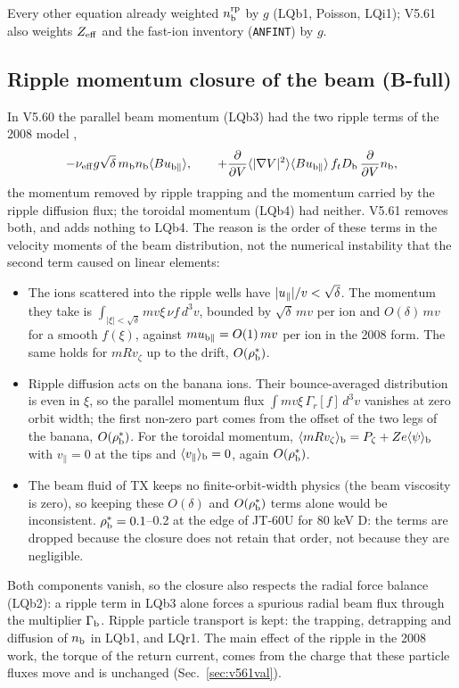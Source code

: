 \documentclass[11pt]{article}
\def\r#1{{\rm#1}}
\def\aves#1{\langle#1\rangle}
\def\para{\parallel}
\def\ddV{\frac{\partial}{\partial V}}
\def\mb{m_\r{b}}
\def\nb{n_\r{b}}
\def\upara#1{u_{\r{#1}\para}}
\def\nbrp{n_\r{b}^\r{rp}}
\def\Db{D_\r{b}}
\def\nueff{\nu_\r{eff}}
\begin{document}
Every other equation already weighted $\nbrp$ by $g$ (LQb1, Poisson, LQi1); V5.61
also weights $Z_\r{eff}$ and the fast-ion inventory (\texttt{ANFINT}) by $g$.

\subsection{Ripple momentum closure of the beam (B-full)}

In V5.60 the parallel beam momentum (LQb3) had the two ripple terms of the 2008
model \cite{NF2008},
\begin{equation}
  -\nueff g\sqrt\delta\,\mb\nb\aves{B\upara{b}} , \qquad
  +\ddV\aves{|\nabla V|^2}\aves{B\upara{b}}\,f_t\Db\,\ddV\nb ,
\end{equation}
the momentum removed by ripple trapping and the momentum carried by the ripple
diffusion flux; the toroidal momentum (LQb4) had neither.  V5.61 removes both,
and adds nothing to LQb4.  The reason is the order of these terms in the
velocity moments of the beam distribution, not the numerical instability that
the second term caused on linear elements:
\begin{itemize}
\item The ions scattered into the ripple wells have $|\upara{}|/v < \sqrt\delta$.
  The momentum they take is $\int_{|\xi|<\sqrt\delta} m v\xi\,\nu f\,d^3v$, bounded by
  $\sqrt\delta\,mv$ per ion and $O(\delta)\,mv$ for a smooth $f(\xi)$, against
  $m\upara{b} = O(1)\,mv$ per ion in the 2008 form.  The same holds for $mRv_\zeta$
  up to the drift, $O(\rho^*_\r{b})$.
\item Ripple diffusion acts on the banana ions.  Their bounce-averaged
  distribution is even in $\xi$, so the parallel momentum flux
  $\int m v\xi\,\Gamma_r[f]\,d^3v$ vanishes at zero orbit width; the first
  non-zero part comes from the offset of the two legs of the banana,
  $O(\rho^*_\r{b})$.  For the toroidal momentum,
  $\aves{mRv_\zeta}_\r{b} = P_\zeta + Ze\aves{\psi}_\r{b}$ with $v_\para = 0$ at the tips and
  $\aves{v_\para}_\r{b} = 0$, again $O(\rho^*_\r{b})$.
\item The beam fluid of TX keeps no finite-orbit-width physics (the beam viscosity
  is zero), so keeping these $O(\delta)$ and $O(\rho^*_\r{b})$ terms alone would be
  inconsistent.  $\rho^*_\r{b} = 0.1$--0.2 at the edge of JT-60U for 80 keV D: the
  terms are dropped because the closure does not retain that order, not because
  they are negligible.
\end{itemize}
Both components vanish, so the closure also respects the radial force balance
(LQb2): a ripple term in LQb3 alone forces a spurious radial beam flux through the
multiplier $\Gamma_\r{b}$.  Ripple particle transport is kept: the trapping,
detrapping and diffusion of $\nb$ in LQb1, and LQr1.  The main effect of the ripple
in the 2008 work, the torque of the return current, comes from the charge that
these particle fluxes move and is unchanged (Sec.~\ref{sec:v561val}).
\end{document}
